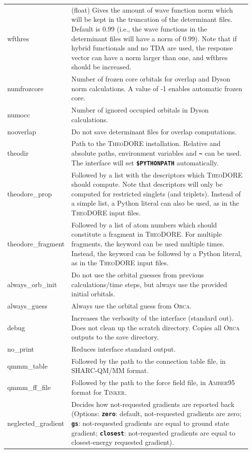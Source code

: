 \documentclass[a4paper,10pt,DIV=15,openany]{scrbook}
\newcommand{\ttt}[1]{\textbf{\texttt{#1}}}
\begin{document}
\begin{table}
\begin{tabular}{>{\ttfamily}lp{12cm}}
\\
wfthres                 &(float) Gives the amount of wave function norm which will be kept in the truncation of the determinant files. Default is 0.99 (i.e., the wave functions in the determinant files will have a norm of 0.99). Note that if hybrid functionals and no TDA are used, the response vector can have a norm larger than one, and wfthres should be increased.
\\
numfrozcore             &Number of frozen core orbitals for overlap and Dyson norm calculations. A value of -1 enables automatic frozen core.
\\
numocc                  &Number of ignored occupied orbitals in Dyson calculations.
\\
nooverlap               &Do not save determinant files for overlap computations.
\\
theodir                 &Path to the \textsc{TheoDORE} installation. Relative and absolute paths, environment variables and \ttt{\textasciitilde} can be used. The interface will set \ttt{\$PYTHONPATH} automatically.
\\
theodore\_prop          &Followed by a list with the descriptors which \textsc{TheoDORE} should compute. Note that descriptors will only be computed for restricted singlets (and triplets). Instead of a simple list, a Python literal can also be used, as in the \textsc{TheoDORE} input files.
\\
theodore\_fragment      &Followed by a list of atom numbers which should constitute a fragment in \textsc{TheoDORE}. For multiple fragments, the keyword can be used multiple times. Instead, the keyword can be followed by a Python literal, as in the \textsc{TheoDORE} input files.
\\
always\_orb\_init       &Do not use the orbital guesses from previous calculations/time steps, but always use the provided initial orbitals.
\\
always\_guess           &Always use the orbital guess from \textsc{Orca}.
\\
  debug                 &Increases the verbosity of the interface (standard out). Does not clean up the scratch directory. Copies all \textsc{Orca} outputs to the save directory.
\\
  no\_print             &Reduces interface standard output.
\\
qmmm\_table             &Followed by the path to the connection table file, in SHARC-QM/MM format.
\\
qmmm\_ff\_file          &Followed by the path to the force field file, in \textsc{Amber}95 format for \textsc{Tinker}.
\\
neglected\_gradient     &Decides how not-requested gradients are reported back (Options: \ttt{zero}: default, not-requested gradients are zero; \ttt{gs}: not-requested gradients are equal to ground state gradient; \ttt{closest}: not-requested gradients are equal to closest-energy requested gradient).
\\
  \hline
  \end{tabular}
\end{table}
\end{document}
